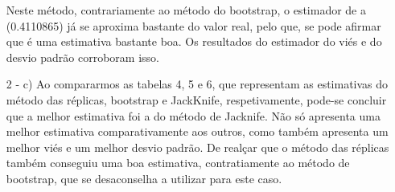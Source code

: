 \documentclass[letterpaper,11pt]{article}
\begin{document}
\begin{enumerate}
Neste método, contrariamente ao método do bootstrap, o estimador de a (0.4110865) já se aproxima bastante do valor real, pelo que, se pode afirmar que é uma estimativa bastante boa. Os resultados do estimador do viés e do desvio padrão corroboram isso.
\item[2 - c)] 
Ao compararmos as tabelas 4, 5 e 6, que representam as estimativas do método das réplicas, bootstrap e JackKnife, respetivamente, pode-se concluir que a melhor estimativa foi a do método de Jacknife. Não só apresenta uma melhor estimativa comparativamente aos outros, como também apresenta um melhor viés e um melhor desvio padrão. De realçar que o método das réplicas também conseguiu uma boa estimativa, contratiamente ao método de bootstrap, que se desaconselha a utilizar para este caso.
\end{enumerate}
\end{document}
